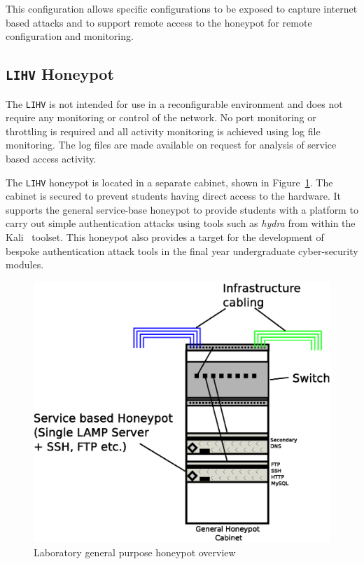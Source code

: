 This configuration allows specific configurations to be exposed to capture internet based attacks and to support remote access to the honeypot for remote configuration and monitoring.

\subsection{\texttt{LIHV} Honeypot}

The \texttt{LIHV} is not intended for use in a reconfigurable environment and does not require any monitoring or control of the network. No port monitoring or throttling is required and all activity monitoring is achieved using log file monitoring. The log files are made available on request for analysis of service based access activity.
 
The \texttt{LIHV} honeypot is located in a separate cabinet, shown in Figure~\ref{fig:Overview2}. The cabinet is secured to prevent students having direct access to the hardware. It supports the general service-base honeypot to provide students with a platform to carry out simple authentication attacks using tools such as \emph{hydra} from within the Kali~\cite{OS:17} toolset. This honeypot also provides a target for the development of bespoke authentication attack tools in the final year undergraduate cyber-security modules.

\begin{figure}[h]
\begin{center}
	\includegraphics[scale=0.4]{Images/Infrastructure2.eps}
\caption{Laboratory general purpose honeypot overview}
\label{fig:Overview2}
\end{center}
\end{figure}

